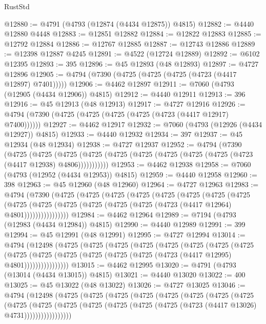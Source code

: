 \begin{lexlean}{RustStd}
\begin{coremodule}
@12880 := @4791 (@4793 (@12874 (@4434 @12875)) @4815)
@12882 := @4440 @12880 @4448
@12883 := @12851 @12882
@12884 := @12822 @12883
@12885 := @12792 @12884
@12886 := @12767 @12885
@12887 := @12743 @12886
@12889 := @12398 @12887 @4245
@12891 := @4522 (@12724 @12889)
@12892 := @6102 @12395
@12893 := 395
@12896 := @45 @12893 (@48 @12893)
@12897 := @4727 @12896
@12905 := @4794 (@7390 (@4725 (@4725 (@4725 (@4723 (@4417 @12897) @7401)))))
@12906 := @4462 @12897
@12911 := @7060 (@4793 (@12905 (@4434 @12906)) @4815)
@12912 := @4440 @12911
@12913 := 396
@12916 := @45 @12913 (@48 @12913)
@12917 := @4727 @12916
@12926 := @4794 (@7390 (@4725 (@4725 (@4725 (@4725 (@4723 (@4417 @12917) @7400))))))
@12927 := @4462 @12917
@12932 := @7060 (@4793 (@12926 (@4434 @12927)) @4815)
@12933 := @4440 @12932
@12934 := 397
@12937 := @45 @12934 (@48 @12934)
@12938 := @4727 @12937
@12952 := @4794
    (@7390
      (@4725
        (@4725
          (@4725 (@4725 (@4725 (@4725 (@4725 (@4725 (@4725 (@4723 (@4417 @12938) @4806)))))))))))
@12953 := @4462 @12938
@12958 := @7060 (@4793 (@12952 (@4434 @12953)) @4815)
@12959 := @4440 @12958
@12960 := 398
@12963 := @45 @12960 (@48 @12960)
@12964 := @4727 @12963
@12983 := @4794
    (@7390
      (@4725
        (@4725
          (@4725
            (@4725
              (@4725
                (@4725
                  (@4725
                    (@4725
                      (@4725
                        (@4725
                          (@4725 (@4725 (@4725 (@4725 (@4723 (@4417 @12964) @4801))))))))))))))))
@12984 := @4462 @12964
@12989 := @7194 (@4793 (@12983 (@4434 @12984)) @4815)
@12990 := @4440 @12989
@12991 := 399
@12994 := @45 @12991 (@48 @12991)
@12995 := @4727 @12994
@13014 := @4794
    (@12498
      (@4725
        (@4725
          (@4725
            (@4725
              (@4725
                (@4725
                  (@4725
                    (@4725
                      (@4725
                        (@4725
                          (@4725 (@4725 (@4725 (@4725 (@4723 (@4417 @12995) @4801))))))))))))))))
@13015 := @4462 @12995
@13020 := @4791 (@4793 (@13014 (@4434 @13015)) @4815)
@13021 := @4440 @13020
@13022 := 400
@13025 := @45 @13022 (@48 @13022)
@13026 := @4727 @13025
@13046 := @4794
    (@12498
      (@4725
        (@4725
          (@4725
            (@4725
              (@4725
                (@4725
                  (@4725
                    (@4725
                      (@4725
                        (@4725
                          (@4725
                            (@4725 (@4725 (@4725 (@4725 (@4723 (@4417 @13026) @4731)))))))))))))))))

\end{coremodule}
\end{lexlean}
